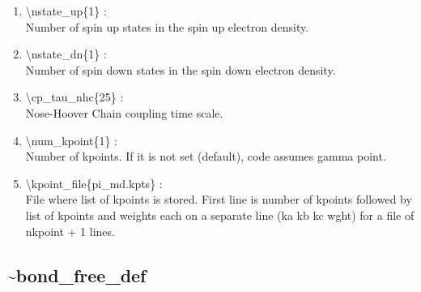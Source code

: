 \documentclass[12pt,titlepage]{article}
\begin{document}
\begin{enumerate}

 \vspace{0.15in} 
 \item  \textbackslash nstate\_up\{1\} : \\ 
     Number of spin up states in the spin up electron density.

 \vspace{0.15in} 
 \item  \textbackslash nstate\_dn\{1\} : \\
     Number of spin down states in the spin down electron density.

 \vspace{0.15in} 
 \item  \textbackslash cp\_tau\_nhc\{25\} : \\
     Nose-Hoover Chain coupling time scale.

 \vspace{0.15in} 
 \item  \textbackslash num\_kpoint\{1\} : \\
  Number of kpoints. If it is not set (default), code assumes gamma point.

 \vspace{0.15in} 
 \item  \textbackslash kpoint\_file\{pi\_md.kpts\} : \\
 File where list of kpoints is stored. First line is number of kpoints followed
by list of kpoints and weights each on a separate line (ka kb kc  wght) for a 
file of nkpoint + 1 lines.

\end{enumerate}

\newpage
\subsection*{\bf \~{}bond\_free\_def}
\end{document}
